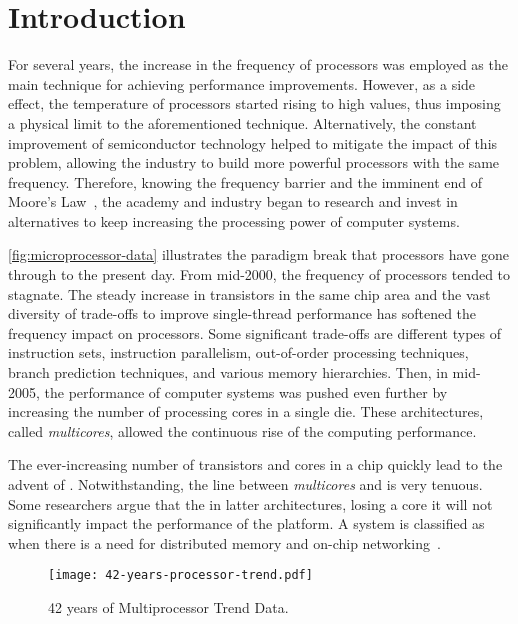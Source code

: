 \chapter{Introduction}
\label{ch.intro}

	For several years, the increase in the frequency of processors was
	employed as the main technique for achieving performance
	improvements. However, as a side effect, the temperature of
	processors started rising to high values, thus imposing a physical
	limit to the aforementioned technique. Alternatively, the constant
	improvement of semiconductor technology helped to mitigate the
	impact of this problem, allowing the industry to build more powerful
	processors with the same frequency. Therefore, knowing the
	frequency barrier and the imminent end of Moore's
	Law~\cite{moore:1965}, the academy and industry began to research
	and invest in alternatives to keep increasing the processing power
	of computer systems.

	\autoref{fig:microprocessor-data} illustrates the paradigm break
	that processors have gone through to the present day. From mid-2000,
	the frequency of processors tended to stagnate. The steady increase
	in transistors in the same chip area and the vast diversity of
	trade-offs to improve single-thread performance has softened the
	frequency impact on processors. Some significant trade-offs are
	different types of instruction sets, instruction parallelism,
	out-of-order processing techniques, branch prediction techniques,
	and various memory hierarchies. Then, in mid-2005, the performance
	of computer systems was pushed even further by increasing the number
	of processing cores in a single die. These architectures, called
	\textit{multicores}, allowed the continuous rise of the computing
	performance.

	The ever-increasing number of transistors and cores in a chip
	quickly lead to the advent of \manycores. Notwithstanding, the line
	between \textit{multicores} and \manycores is very tenuous. Some
	researchers argue that the in latter architectures, losing a core it
	will not significantly impact the performance of the platform. A
	system is classified as \manycore when there is a need for
	distributed memory and on-chip networking~\cite{freitas:thesis}.

	\begin{figure}[t]
		\centering%
		\caption{42 years of Multiprocessor Trend Data.}%
		\label{fig:microprocessor-data}%
		\texttt{[image: 42-years-processor-trend.pdf]}%
	\end{figure}

